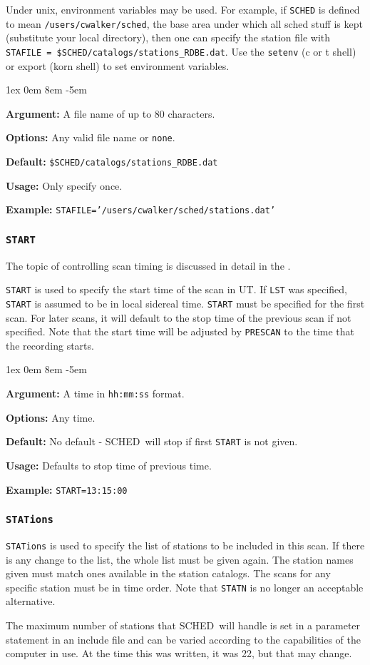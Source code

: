 \documentclass{report}
\newcommand{\schedb}{{\sc SCHED~}}
\newcommand{\rcwbox}[5]{
  \begin{list}{}{\parsep 1ex  \itemsep 0em
                 \leftmargin 8em  \itemindent -5em }
    \item {\bf Argument:} #1
    \item {\bf Options:}  #2
    \item {\bf Default:}  #3
    \item {\bf Usage:}    #4
    \item {\bf Example:}  #5
  \end{list}
}
\begin{document}
Under unix, environment variables may be used.  For example, if
{\tt SCHED} is defined to mean {\tt /users/cwalker/sched}, the
base area under which all sched stuff is kept (substitute your
local directory), then one can specify the station file with
{\tt STAFILE = \$SCHED/catalogs/stations\_RDBE.dat}.  Use the {\tt setenv}
(c or t shell) or export (korn shell) to set environment variables.

\rcwbox
{A file name of up to 80 characters.}
{Any valid file name or {\tt none}.}
{{\tt \$SCHED/catalogs/stations\_RDBE.dat}}
{Only specify once.}
{{\tt STAFILE='/users/cwalker/sched/stations.dat'}}


\subsubsection{\label{MP:START}{\tt START}}

The topic of controlling scan timing is discussed in detail in
the .

{\tt START} is used to specify the start time of the scan in UT. If
{\tt LST} was specified, {\tt START} is assumed to be in local
sidereal time. {\tt START} must be specified for the first scan. For
later scans, it will default to the stop time of the previous scan if
not specified.  Note that the start time will be adjusted by
{\tt PRESCAN} to the time that the recording starts.

\rcwbox
{A time in {\tt hh:mm:ss} format.}
{Any time.}
{No default - \schedb will stop if first {\tt START} is not
given.}
{Defaults to stop time of previous time.}
{{\tt START=13:15:00}}


\subsubsection{\label{MP:STATIONS}{\tt STATions}}

{\tt STATions} is used to specify the list of stations to be included
in this scan. If there is any change to the list, the whole list
must be given again. The station names given must match ones
available in the station catalogs. The scans for any specific station
must be in time order.  Note that {\tt STATN} is no longer an
acceptable alternative.

The maximum number of stations that \schedb will handle is set
in a parameter statement in an include file and can be varied according
to the capabilities of the computer in use.  At the time this was
written, it was 22, but that may change.
\end{document}
